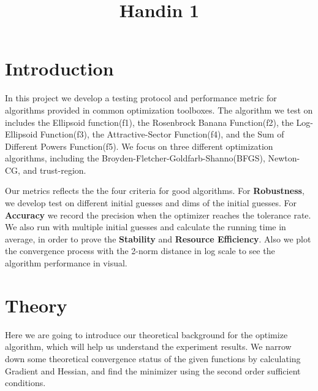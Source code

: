 \documentclass[12pt]{article}
\title{Handin 1}
\begin{document}
\maketitle

\section{Introduction}

In this project we develop a testing protocol and performance metric for algorithms provided in common optimization toolboxes. The algorithm we test on includes the Ellipsoid function(f1), the Rosenbrock Banana Function(f2), the Log-Ellipsoid Function(f3), the Attractive-Sector Function(f4), and the Sum of Different Powers Function(f5). We focus on three different optimization algorithms, including the Broyden-Fletcher-Goldfarb-Shanno(BFGS), Newton-CG, and trust-region.

Our metrics reflects the the four criteria for good algorithms. For \textbf{Robustness}, we develop test on different initial guesses and dims of the initial guesses. For \textbf{Accuracy} we record the precision when the optimizer reaches the tolerance rate. We also run with multiple initial guesses and calculate the running time in average, in order to prove the \textbf{Stability} and \textbf{Resource Efficiency}. %
Also we plot the convergence process with the 2-norm distance in log scale to see the algorithm performance in visual. 


\section{Theory}


Here we are going to introduce our theoretical background for the optimize algorithm, which will help us understand the experiment results. We narrow down some theoretical convergence status of the given functions by calculating Gradient and Hessian, and find the minimizer using the second order sufficient conditions. 
\end{document}
